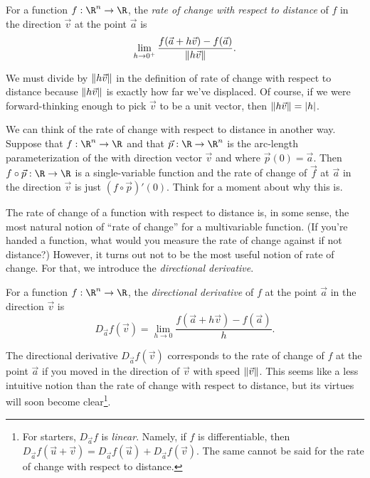 \begin{definition}
	For a function $f:\R^n\to\R$, the \emph{rate of change with respect to distance} of $f$
	in the direction $\vec v$ at the point $\vec a$ is
	\[
		\lim_{h\to 0^+}\frac{f(\vec a+h\vec v)-f(\vec a)}{\lVert h\vec v\rVert}.
	\]
\end{definition}

We must divide by $\lVert h\vec v\rVert$ in the definition of rate of change with respect to distance
because $\lVert h\vec v\rVert$ is exactly how far we've displaced.  Of course, if we were forward-thinking
enough to pick $\vec v$ to be a unit vector, then $\lVert h\vec v\rVert=\lvert h\rvert$.

We can think of the rate of change with respect to distance in another way.  Suppose that $f:\R^n\to \R$
and that $\vec p:\R\to\R^n$ is the arc-length parameterization of the with direction
vector $\vec v$ and where $\vec p(0)=\vec a$.  Then $f\circ \vec p:\R\to\R$ is a single-variable
function and the rate of change of $\vec f$ at $\vec a$ in the direction $\vec v$ is just $(f\circ\vec p)'(0)$.
Think for a moment about why this is.

The rate of change of a function with respect to distance is, in some sense, the most natural
notion of ``rate of change'' for a multivariable function.  (If you're handed a function, what
would you measure the rate of change against if not distance?)  However, it turns out not
to be the most useful notion of rate of change.  For that, we introduce the 
\emph{directional derivative}.

\begin{definition}
	For a function $f:\R^n\to\R$, the \emph{directional derivative} of $f$ at the point $\vec a$
	in the direction $\vec v$ is
	\[
		D_{\vec a}f(\vec v) = \lim_{h\to0}\frac{f(\vec a+h\vec v)-f(\vec a)}{h}.
	\]
\end{definition}

The directional derivative $D_{\vec a}f(\vec v)$ corresponds to the rate of change of $f$ at the point $\vec a$
if you moved in the direction of $\vec v$ with speed $\lVert\vec v\rVert$.  This seems 
like a less intuitive notion than the rate of change with respect to distance, but its virtues will
soon become clear\footnote{ For starters, $D_{\vec a}f$ is \emph{linear}.  Namely, if $f$ is differentiable,
then $D_{\vec a}f(\vec u+\vec v)=D_{\vec a}f(\vec u)+D_{\vec a}f(\vec v)$.  The same cannot
be said for the rate of change with respect to distance.}.

